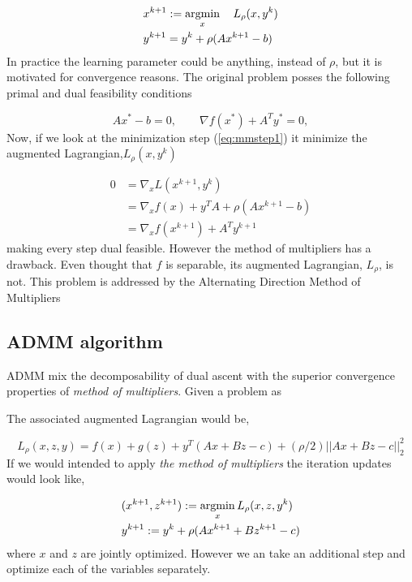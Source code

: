 \begin{align}
	&x^{k+1} :=\operatorname*{argmin}_x \quad L_\rho(x,y^k)\label{eq:mmstep1}\\ 
	&y^{k+1} = y^k + \rho(Ax^{k+1}-b)		
\end{align}
In practice the learning parameter could be anything, instead of $\rho$, but it is motivated for convergence reasons. The original problem posses the following primal and dual feasibility conditions

\begin{equation*}
	Ax^* -b =0, \qquad \nabla f(x^*) + A^Ty^* = 0,
\end{equation*}
Now, if we look at the minimization step (\ref{eq:mmstep1}) it minimize the augmented Lagrangian,$L_\rho(x,y^k)$

\begin{align*}
	0 &=\nabla_xL(x^{k+1},y^k)\\
	&= \nabla_x f(x) + y^TA + \rho(Ax^{k+1} -b)\\
	&= \nabla_x f(x^{k+1}) + A^Ty^{k+1}
\end{align*}
making every step dual feasible. However the method of multipliers has a drawback. Even thought that $f$ is separable, its augmented Lagrangian, $L_\rho$, is not. This problem is addressed by the Alternating Direction Method of Multipliers

\subsection{ADMM algorithm}

ADMM mix the decomposability of dual ascent with the superior convergence properties of \textit{method of multipliers}. Given a problem as 

The associated augmented Lagrangian would be,

\begin{equation*}
	L_\rho(x,z,y) = f(x)+g(z)+y^T(Ax + Bz-c)+(\rho/2)||Ax+Bz-c||_2^2
\end{equation*}
If we would intended to apply \textit{the method of multipliers} the iteration updates would look like,

\begin{align*}
	&(x^{k+1},z^{k+1}) := \operatorname*{argmin}_x L_\rho(x,z,y^k)\\
	&y^{k+1} := y^k + \rho(Ax^{k+1}+Bz^{k+1} -c)
\end{align*}
where $x$ and $z$ are jointly optimized. However we an take an additional step and optimize each of the variables separately.

